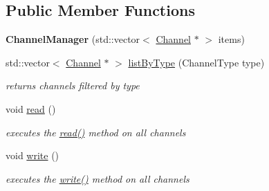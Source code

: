 \subsection*{Public Member Functions}
\begin{DoxyCompactItemize}
\item 
\hypertarget{classdrobot_1_1device_1_1channel_1_1ChannelManager_aa5f87db0706bef4130d8e016f02178b2}{{\bfseries Channel\-Manager} (std\-::vector$<$ \hyperlink{classdrobot_1_1device_1_1channel_1_1Channel}{Channel} $\ast$ $>$ items)}\label{classdrobot_1_1device_1_1channel_1_1ChannelManager_aa5f87db0706bef4130d8e016f02178b2}

\item 
std\-::vector$<$ \hyperlink{classdrobot_1_1device_1_1channel_1_1Channel}{Channel} $\ast$ $>$ \hyperlink{classdrobot_1_1device_1_1channel_1_1ChannelManager_a24b3b63d09b4357a1632d8f8f0e7798b}{list\-By\-Type} (Channel\-Type type)
\begin{DoxyCompactList}\small\item\em returns channels filtered by type \end{DoxyCompactList}\item 
\hypertarget{classdrobot_1_1device_1_1channel_1_1ChannelManager_ad200adec504cad270c5da9d244bd2e28}{void \hyperlink{classdrobot_1_1device_1_1channel_1_1ChannelManager_ad200adec504cad270c5da9d244bd2e28}{read} ()}\label{classdrobot_1_1device_1_1channel_1_1ChannelManager_ad200adec504cad270c5da9d244bd2e28}

\begin{DoxyCompactList}\small\item\em executes the \hyperlink{classdrobot_1_1device_1_1channel_1_1ChannelManager_ad200adec504cad270c5da9d244bd2e28}{read()} method on all channels \end{DoxyCompactList}\item 
\hypertarget{classdrobot_1_1device_1_1channel_1_1ChannelManager_a103b360e79080b145bae8c81d33ba4c9}{void \hyperlink{classdrobot_1_1device_1_1channel_1_1ChannelManager_a103b360e79080b145bae8c81d33ba4c9}{write} ()}\label{classdrobot_1_1device_1_1channel_1_1ChannelManager_a103b360e79080b145bae8c81d33ba4c9}

\begin{DoxyCompactList}\small\item\em executes the \hyperlink{classdrobot_1_1device_1_1channel_1_1ChannelManager_a103b360e79080b145bae8c81d33ba4c9}{write()} method on all channels \end{DoxyCompactList}\end{DoxyCompactItemize}
